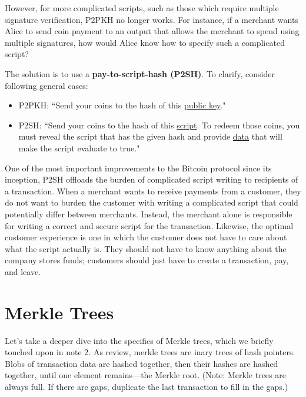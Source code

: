 \documentclass[full.tex]{subfiles}
\begin{document}
 However, for more complicated scripts, such as those which require multiple signature verification, P2PKH no longer works. For instance, if a merchant wants Alice to send coin payment to an output that allows the merchant to spend using multiple signatures, how would Alice know how to specify such a complicated script?
 
 The solution is to use a \textbf{pay-to-script-hash (P2SH)}. To clarify, consider following general cases:
 
 \begin{itemize}
     \item P2PKH: ``Send your coins to the hash of this \underline{public key}."
     \item P2SH: ``Send your coins to the hash of this \underline{script}. To redeem those coins, you must reveal the script that has the given hash and provide \underline{data} that will make the script evaluate to true."
 \end{itemize}
 
 One of the most important improvements to the Bitcoin protocol since its inception, P2SH offloads the burden of complicated script writing to recipients of a transaction. When a merchant wants to receive payments from a customer, they do not want to burden the customer with writing a complicated script that could potentially differ between merchants. Instead, the merchant alone is responsible for writing a correct and secure script for the transaction. Likewise, the optimal customer experience is one in which the customer does not have to care about what the script actually is. They should not have to know anything about the company stores funds; customers should just have to create a transaction, pay, and leave.
 
 \section*{Merkle Trees}
 
 Let's take a deeper dive into the specifics of Merkle trees, which we briefly touched upon in note 2. As review, merkle trees are inary trees of hash pointers. Blobs of transaction data are hashed together, then their hashes are hashed together, until one element remains---the Merkle root. (Note: Merkle trees are always full. If there are gaps, duplicate the last transaction to fill in the gaps.)
 
\end{document}
